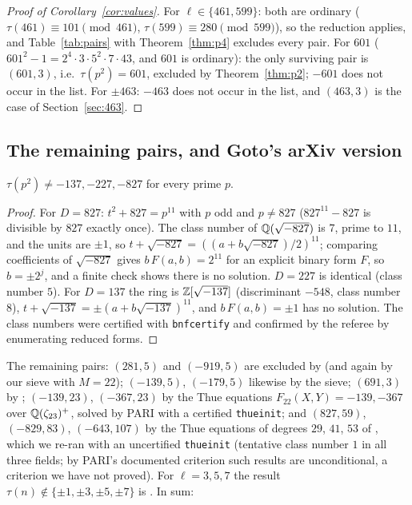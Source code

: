 \begin{proof}[Proof of Corollary~\ref{cor:values}]
For $\ell\in\{461,599\}$: both are ordinary ($\tau(461)\equiv101\pmod{461}$, $\tau(599)\equiv280\pmod{599}$), so the reduction applies, and Table~\ref{tab:pairs} with Theorem~\ref{thm:p4} excludes every pair. For $601$ ($601^2-1=2^4\cdot3\cdot5^2\cdot7\cdot43$, and $601$ is ordinary): the only surviving pair is $(601,3)$, i.e.\ $\tau(p^2)=601$, excluded by Theorem~\ref{thm:p2}; $-601$ does not occur in the list. For $\pm463$: $-463$ does not occur in the list, and $(463,3)$ is the case of Section~\ref{sec:463}.
\end{proof}

\subsection{The remaining pairs, and Goto's arXiv version}
\begin{proposition}\label{prop:minusD}
$\tau(p^2)\ne-137,-227,-827$ for every prime $p$.
\end{proposition}

\begin{proof}
For $D=827$: $t^2+827=p^{11}$ with $p$ odd and $p\ne827$ ($827^{11}-827$ is divisible by $827$ exactly once). The class number of $\mathbb Q(\sqrt{-827})$ is $7$, prime to $11$, and the units are $\pm1$, so $t+\sqrt{-827}=((a+b\sqrt{-827})/2)^{11}$; comparing coefficients of $\sqrt{-827}$ gives $b\,F(a,b)=2^{11}$ for an explicit binary form $F$, so $b=\pm2^j$, and a finite check shows there is no solution. $D=227$ is identical (class number $5$). For $D=137$ the ring is $\mathbb Z[\sqrt{-137}]$ (discriminant $-548$, class number $8$), $t+\sqrt{-137}=\pm(a+b\sqrt{-137})^{11}$, and $b\,F(a,b)=\pm1$ has no solution. The class numbers were certified with \texttt{bnfcertify} and confirmed by the referee by enumerating reduced forms.
\end{proof}

The remaining pairs: $(281,5)$ and $(-919,5)$ are excluded by \cite[Lemma~2.15]{Goto} (and again by our sieve with $M=22$); $(-139,5)$, $(-179,5)$ likewise by the sieve; $(691,3)$ by \cite[Theorem~1.2(1)]{BCOT}; $(-139,23)$, $(-367,23)$ by the Thue equations $F_{22}(X,Y)=-139,-367$ over $\mathbb Q(\zeta_{23})^+$, solved by PARI with a certified \texttt{thueinit}; and $(827,59)$, $(-829,83)$, $(-643,107)$ by the Thue equations of degrees $29$, $41$, $53$ of \cite[Lemma~2.14]{Goto}, which we re-ran with an uncertified \texttt{thueinit} (tentative class number $1$ in all three fields; by PARI's documented criterion such results are unconditional, a criterion we have not proved). For $\ell=3,5,7$ the result $\tau(n)\notin\{\pm1,\pm3,\pm5,\pm7\}$ is \cite[Theorem~1.1]{BCO}. In sum:

